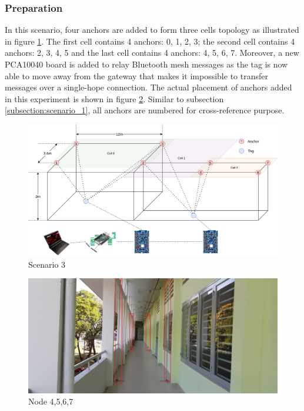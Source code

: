 \documentclass[\main/main.tex]{subfiles}
\begin{document}
\subsubsection{Preparation}
In this scenario, four anchors are added to form three cells topology as illustrated in figure \ref{fig:scenario_3}. The first cell contains 4 anchors: 0, 1, 2, 3; the second cell contains 4 anchors: 2, 3, 4, 5 and the last cell contains 4 anchors: 4, 5, 6, 7. Moreover, a new PCA10040 board is added to relay Bluetooth mesh messages as the tag is now able to move away from the gateway that makes it impossible to transfer messages over a single-hope connection. The actual placement of anchors added in this experiment is shown in figure \ref{fig:node_4_5_6_7}.
Similar to subsection \ref{subsection:scenario_1}, all anchors are numbered for cross-reference purpose.
\begin{figure}[H]   
    \centering
    \includegraphics[width=1\textwidth]{system_overview_phy_full.png}
    \caption{Scenario 3}
    \label{fig:scenario_3}
\end{figure}
\begin{figure}[H]      
    \centering
    \includegraphics[width=1\textwidth]{arena_03.jpg}
    \caption{Node 4,5,6,7}
    \label{fig:node_4_5_6_7}
\end{figure}
\end{document}
